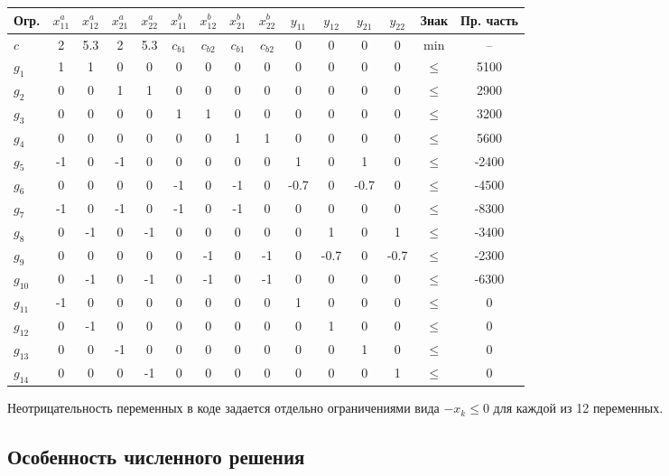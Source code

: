 \documentclass[a4paper,12pt]{article}
\begin{document}
\begin{center}
\small
\setlength{\tabcolsep}{4pt}
\begin{tabular}{>{\centering\arraybackslash}m{1.7cm}cccccccccccccc}
\toprule
Огр. &
$x_{11}^a$ & $x_{12}^a$ & $x_{21}^a$ & $x_{22}^a$ &
$x_{11}^b$ & $x_{12}^b$ & $x_{21}^b$ & $x_{22}^b$ &
$y_{11}$ & $y_{12}$ & $y_{21}$ & $y_{22}$ &
Знак & Пр. часть \\
\midrule
$c$ & 2 & 5.3 & 2 & 5.3 & $c_{b1}$ & $c_{b2}$ & $c_{b1}$ & $c_{b2}$ & 0 & 0 & 0 & 0 & min & -- \\
$g_1$  & 1 & 1 & 0 & 0 & 0 & 0 & 0 & 0 & 0 & 0 & 0 & 0 & $\le$ & 5100 \\
$g_2$  & 0 & 0 & 1 & 1 & 0 & 0 & 0 & 0 & 0 & 0 & 0 & 0 & $\le$ & 2900 \\
$g_3$  & 0 & 0 & 0 & 0 & 1 & 1 & 0 & 0 & 0 & 0 & 0 & 0 & $\le$ & 3200 \\
$g_4$  & 0 & 0 & 0 & 0 & 0 & 0 & 1 & 1 & 0 & 0 & 0 & 0 & $\le$ & 5600 \\
$g_5$  & -1 & 0 & -1 & 0 & 0 & 0 & 0 & 0 & 1 & 0 & 1 & 0 & $\le$ & -2400 \\
$g_6$  & 0 & 0 & 0 & 0 & -1 & 0 & -1 & 0 & -0.7 & 0 & -0.7 & 0 & $\le$ & -4500 \\
$g_7$  & -1 & 0 & -1 & 0 & -1 & 0 & -1 & 0 & 0 & 0 & 0 & 0 & $\le$ & -8300 \\
$g_8$  & 0 & -1 & 0 & -1 & 0 & 0 & 0 & 0 & 0 & 1 & 0 & 1 & $\le$ & -3400 \\
$g_9$  & 0 & 0 & 0 & 0 & 0 & -1 & 0 & -1 & 0 & -0.7 & 0 & -0.7 & $\le$ & -2300 \\
$g_{10}$ & 0 & -1 & 0 & -1 & 0 & -1 & 0 & -1 & 0 & 0 & 0 & 0 & $\le$ & -6300 \\
$g_{11}$ & -1 & 0 & 0 & 0 & 0 & 0 & 0 & 0 & 1 & 0 & 0 & 0 & $\le$ & 0 \\
$g_{12}$ & 0 & -1 & 0 & 0 & 0 & 0 & 0 & 0 & 0 & 1 & 0 & 0 & $\le$ & 0 \\
$g_{13}$ & 0 & 0 & -1 & 0 & 0 & 0 & 0 & 0 & 0 & 0 & 1 & 0 & $\le$ & 0 \\
$g_{14}$ & 0 & 0 & 0 & -1 & 0 & 0 & 0 & 0 & 0 & 0 & 0 & 1 & $\le$ & 0 \\
\bottomrule
\end{tabular}
\end{center}

Неотрицательность переменных в коде задается отдельно ограничениями вида
$-x_k \le 0$ для каждой из 12 переменных.

\pagebreak
\subsection{Особенность численного решения}
\end{document}
